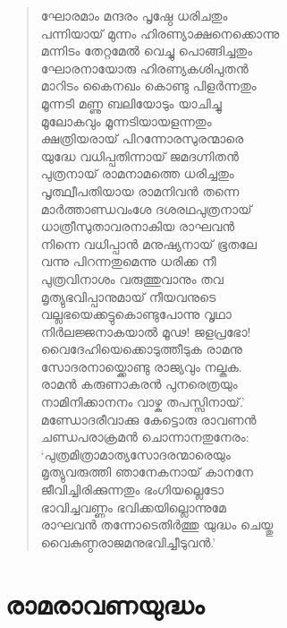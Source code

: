 \begin{verse}
ഘോരമാം മന്ദരം പൃഷ്ഠേ ധരിചതും\\
പന്നിയായ് മുന്നം ഹിരണ്യാക്ഷനെക്കൊന്നു\\
മന്നിടം തേറ്റമേല്‍ വെച്ചു പൊങ്ങിച്ചതും\\
ഘോരനായോരു ഹിരണ്യകശിപുതന്‍\\
മാറിടം കൈനഖം കൊണ്ടു പിളര്‍ന്നതും\\
മൂന്നടി മണ്ണു ബലിയോടും യാചിച്ചു\\
മൂലോകവും മൂന്നടിയായളന്നതും\\
ക്ഷത്രിയരായ് പിറന്നോരസുരന്മാരെ\\
യുദ്ധേ വധിപ്പതിന്നായ് ജമദഗ്നിതന്‍\\
പുത്രനായ് രാമനാമത്തെ ധരിച്ചതും\\
പൃത്ഥ്വീപതിയായ രാമനിവന്‍ തന്നെ\\
മാര്‍ത്താണ്ഡവംശേ ദശരഥപുത്രനായ്\\
ധാത്രീസുതാവരനാകിയ രാഘവന്‍\\
നിന്നെ വധിപ്പാന്‍ മനുഷ്യനായ് ഭൂതലേ\\
വന്നു പിറന്നതുമെന്നു ധരിക്ക നീ\\
പുത്രവിനാശം വരുത്തുവാനും തവ\\
മൃത്യുഭവിപ്പാനുമായ് നീയവനുടെ\\
വല്ലഭയെക്കട്ടുകൊണ്ടുപോന്നു വൃഥാ\\
നിര്‍ലജ്ജനാകയാല്‍ മൂഢ! ജളപ്രഭോ!\\
വൈദേഹിയെക്കൊടുത്തീടുക രാമനു\\
സോദരനായ്ക്കൊണ്ടു രാജ്യവും നല്കുക.\\
രാമന്‍ കരുണാകരന്‍ പുനരെത്രയും\\
നാമിനിക്കാനനം വാഴ്ക തപസ്സിനായ്.’\\
മണ്ഡോദരീവാക്കു കേട്ടൊരു രാവണന്‍\\
ചണ്ഡപരാക്രമന്‍ ചൊന്നാനതുനേരം:\\
‘പുത്രമിത്രാമാത്യസോദരന്മാരെയും\\
മൃത്യുവരുത്തി ഞാനേകനായ് കാനനേ\\
ജീവിച്ചിരിക്കുന്നതും ഭംഗിയല്ലെടോ\\
ഭാവിച്ചവണ്ണം ഭവിക്കയില്ലൊന്നുമേ\\
രാഘവന്‍ തന്നോടെതിര്‍ത്തു യുദ്ധം ചെയ്തു\\
വൈകുണ്ഠരാജമനുഭവിച്ചീടുവന്‍.’
\end{verse}


\section{രാമരാവണയുദ്ധം}

